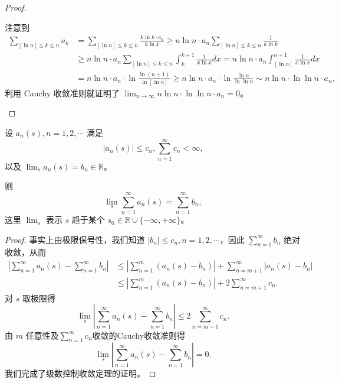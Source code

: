 \documentclass[../../main.tex]{subfiles}
\begin{document}
\begin{proof}
\begin{enumerate}
注意到
\begin{align*}
\sum_{[\ln n] \leqslant k \leqslant n} a_k &= \sum_{[\ln n] \leqslant k \leqslant n} \frac{k \ln k \cdot a_k}{k \ln k} \geqslant n \ln n \cdot a_n \sum_{[\ln n] \leqslant k \leqslant n} \frac{1}{k \ln k} \\
&\geqslant n \ln n \cdot a_n \sum_{[\ln n] \leqslant k \leqslant n} \int_{k}^{k + 1} \frac{1}{x \ln x} dx = n \ln n \cdot a_n \int_{[\ln n]}^{n + 1} \frac{1}{x \ln x} dx \\
&= n \ln n \cdot a_n \cdot \ln \frac{\ln (n + 1)}{\ln [\ln n]} \geqslant n \ln n \cdot a_n \cdot \ln \frac{\ln n}{\ln \ln n} \sim n \ln n \cdot \ln \ln n \cdot a_n,
\end{align*}
利用 Cauchy 收敛准则就证明了 \( \lim_{n \to \infty} n \ln n \cdot \ln \ln n \cdot a_n = 0 \)。
\end{enumerate}
\end{proof}

\begin{theorem}[级数的控制收敛定理]\label{theorem:级数的控制收敛定理}
设 \( a_n(s), n = 1, 2, \cdots \) 满足
\[
|a_n(s)| \leqslant c_n, \sum_{n = 1}^{\infty} c_n < \infty,
\]
以及 \( \lim_{s} a_n(s) = b_n \in \mathbb{R} \)。

则
\[
\lim_{s} \sum_{n = 1}^{\infty} a_n(s) = \sum_{n = 1}^{\infty} b_n,
\]
这里 \( \lim_{s} \) 表示 \( s \) 趋于某个 \( s_0 \in \mathbb{R} \cup \{-\infty, +\infty\} \)。
\end{theorem}
\begin{proof}
事实上由极限保号性，我们知道 \( |b_n| \leqslant c_n, n = 1, 2, \cdots \)，因此 \( \sum_{n = 1}^{\infty} b_n \) 绝对收敛，从而
\begin{align*}
\left| \sum_{n = 1}^{\infty} a_n(s) - \sum_{n = 1}^{\infty} b_n \right| &\leqslant \left| \sum_{n = 1}^{m} (a_n(s) - b_n) \right| + \sum_{n = m + 1}^{\infty} |a_n(s) - b_n| \\
&\leqslant \left| \sum_{n = 1}^{m} (a_n(s) - b_n) \right| + 2 \sum_{n = m + 1}^{\infty} c_n.
\end{align*}
对 \( s \) 取极限得
\[
\lim_{s} \left| \sum_{n = 1}^{\infty} a_n(s) - \sum_{n = 1}^{\infty} b_n \right| \leqslant 2 \sum_{n = m + 1}^{\infty} c_n.
\]
由 \( m \) 任意性及$\sum_{n=1}^{\infty}{c_n}$收敛的Cauchy收敛准则得
\[
\lim_{s} \left| \sum_{n = 1}^{\infty} a_n(s) - \sum_{n = 1}^{\infty} b_n \right| = 0.
\]
我们完成了级数控制收敛定理的证明。
\end{proof}
\end{document}
